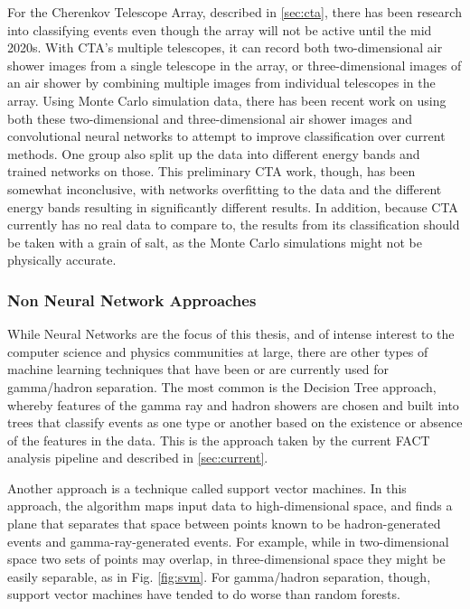 \documentclass[12pt]{article}
\begin{document}
For the Cherenkov Telescope Array, described in \ref{sec:cta}, there has been research into classifying events even though the array will not be active until the mid 2020s. With CTA's multiple telescopes, it can record both two-dimensional air shower images from a single telescope in the array, or three-dimensional images of an air shower by combining multiple images from individual telescopes in the array. Using Monte Carlo simulation data, there has been recent work on using both these two-dimensional and three-dimensional air shower images and convolutional neural networks to attempt to improve classification over current methods\cite{2017arXiv170905889N}. One group also split up the data into different energy bands and trained networks on those. This preliminary CTA work, though, has been somewhat inconclusive, with networks overfitting to the data and the different energy bands resulting in significantly different results\cite{2017arXiv171106298L}. In addition, because CTA currently has no real data to compare to, the results from its classification should be taken with a grain of salt, as the Monte Carlo simulations might not be physically accurate.

\subsubsection{Non Neural Network Approaches}

While Neural Networks are the focus of this thesis, and of intense interest to the computer science and physics communities at large, there are other types of machine learning techniques that have been or are currently used for gamma/hadron separation. The most common is the Decision Tree approach, whereby features of the gamma ray and hadron showers are chosen and built into trees that classify events as one type or another based on the existence or absence of the features in the data. This is the approach taken by the current FACT analysis pipeline and described in \ref{sec:current}.

Another approach is a technique called support vector machines. In this approach, the algorithm maps input data to high-dimensional space, and finds a plane that separates that space between points known to be hadron-generated events and gamma-ray-generated events. For example, while in two-dimensional space two sets of points may overlap, in three-dimensional space they might be easily separable, as in Fig. \ref{fig:svm}. For gamma/hadron separation, though, support vector machines have tended to do worse than random forests\cite{boinee2005ensembling}.
\end{document}
